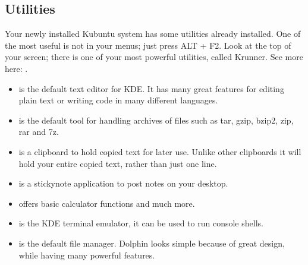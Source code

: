 \documentclass[letterpaper,10pt,english]{sphinxmanual}
\begin{document}
\subsection{Utilities}
\label{\detokenize{docs/software-management/software:utilities}}
\sphinxAtStartPar
Your newly installed Kubuntu system has some utilities already installed. One of the most useful is not in your menus; just press ALT + F2. Look at the top of your screen; there is one of your most powerful utilities, called Krunner. See more here: .
\begin{itemize}
\item {} 
\sphinxAtStartPar
{} is the default text editor for KDE. It has many great features for editing plain text or writing code in many different languages.

\item {} 
\sphinxAtStartPar
{} is the default tool for handling archives of files such as tar, gzip, bzip2, zip, rar and 7z.

\item {} 
\sphinxAtStartPar
{} is a clipboard to hold copied text for later use. Unlike other clipboards it will hold your entire copied text, rather than just one line.

\item {} 
\sphinxAtStartPar
{} is a sticky\sphinxhyphen{}note application to post notes on your desktop.

\item {} 
\sphinxAtStartPar
{} offers basic calculator functions and much more.

\item {} 
\sphinxAtStartPar
{} is the KDE terminal emulator, it can be used to run console shells.

\item {} 
\sphinxAtStartPar
{} is the default file manager. Dolphin looks simple because of great design, while having many powerful features.

\end{itemize}
\end{document}
